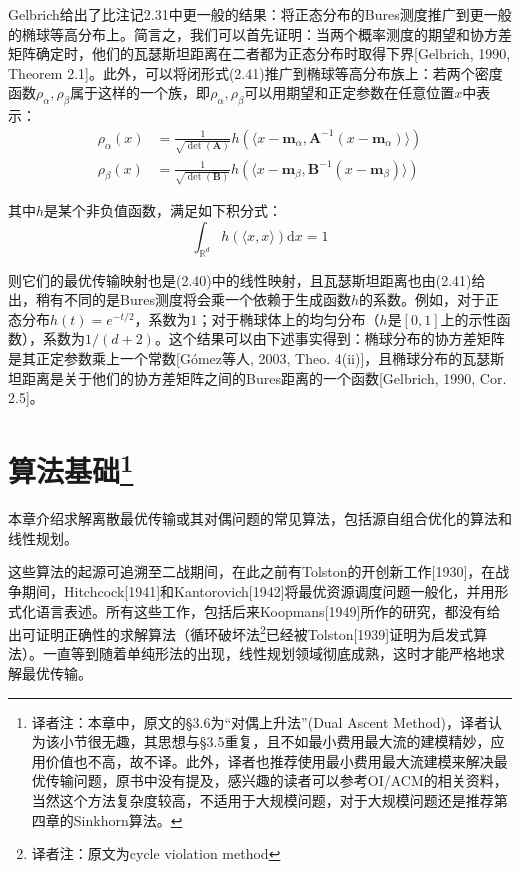 \documentclass[cn,10pt,math=newtx,citestyle=gb7714-2015,bibstyle=gb7714-2015]{elegantbook}
\begin{document}
\begin{postulate}[椭球等高分布的距离]
Gelbrich给出了比注记2.31中更一般的结果：将正态分布的Bures测度推广到更一般的椭球等高分布上。简言之，我们可以首先证明：当两个概率测度的期望和协方差矩阵确定时，他们的瓦瑟斯坦距离在二者都为正态分布时取得下界[Gelbrich, 1990, Theorem 2.1]。此外，可以将闭形式(2.41)推广到椭球等高分布族上：若两个密度函数$\rho_\alpha,\rho_\beta$属于这样的一个族，即$\rho_\alpha,\rho_\beta$可以用期望和正定参数在任意位置$x$中表示：
\begin{align*}
    \rho_\alpha(x)&=\frac{1}{\sqrt{\det(\mathbf{A})}}h(\langle x-\mathbf{m}_\alpha, \mathbf{A}^{-1}(x-\mathbf{m}_\alpha) \rangle)\\
    \rho_\beta(x)&=\frac{1}{\sqrt{\det(\mathbf{B})}}h(\langle x-\mathbf{m}_\beta, \mathbf{B}^{-1}(x-\mathbf{m}_\beta) \rangle)
\end{align*}

其中$h$是某个非负值函数，满足如下积分式：
\begin{equation*}
    \int_{\mathbb{R}^d} h(\langle x,x \rangle) \text{d}x = 1
\end{equation*}

则它们的最优传输映射也是(2.40)中的线性映射，且瓦瑟斯坦距离也由(2.41)给出，稍有不同的是Bures测度将会乘一个依赖于生成函数$h$的系数。例如，对于正态分布$h(t)=e^{-t/2}$，系数为$1$；对于椭球体上的均匀分布（$h$是$[0,1]$上的示性函数），系数为$1/(d+2)$。这个结果可以由下述事实得到：椭球分布的协方差矩阵是其正定参数乘上一个常数[G\'omez等人, 2003, Theo. 4(ii)]，且椭球分布的瓦瑟斯坦距离是关于他们的协方差矩阵之间的Bures距离的一个函数[Gelbrich, 1990, Cor. 2.5]。
\end{postulate}

\chapter{算法基础\footnote{译者注：本章中，原文的\S 3.6为“对偶上升法”(Dual Ascent Method)，译者认为该小节很无趣，其思想与\S 3.5重复，且不如最小费用最大流的建模精妙，应用价值也不高，故不译。此外，译者也推荐使用最小费用最大流建模来解决最优传输问题，原书中没有提及，感兴趣的读者可以参考OI/ACM的相关资料，当然这个方法复杂度较高，不适用于大规模问题，对于大规模问题还是推荐第四章的Sinkhorn算法。}}

本章介绍求解离散最优传输或其对偶问题的常见算法，包括源自组合优化的算法和线性规划。

这些算法的起源可追溯至二战期间，在此之前有Tolston的开创新工作[1930]，在战争期间，Hitchcock[1941]和Kantorovich[1942]将最优资源调度问题一般化，并用形式化语言表述。所有这些工作，包括后来Koopmans[1949]所作的研究，都没有给出可证明正确性的求解算法（循环破坏法\footnote{译者注：原文为cycle violation method}已经被Tolston[1939]证明为启发式算法）。一直等到随着单纯形法的出现，线性规划领域彻底成熟，这时才能严格地求解最优传输。
\end{document}
